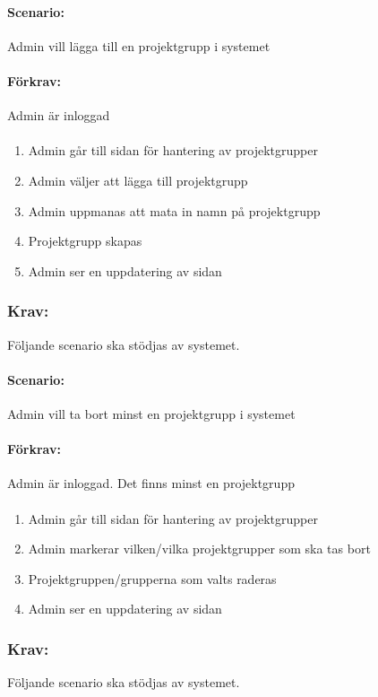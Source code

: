 \documentclass[paper=a4, fontsize=11pt,twoside]{article}
\begin{document}
\paragraph{Scenario:}
Admin vill lägga till en projektgrupp i systemet
\paragraph{Förkrav:}
Admin är inloggad
\paragraph{}
\begin{enumerate}
\item Admin går till sidan för hantering av projektgrupper
\item Admin väljer att lägga till projektgrupp
\item Admin uppmanas att mata in namn på projektgrupp
\item Projektgrupp skapas
\item Admin ser en uppdatering av sidan
\end{enumerate}

\subsubsection*{Krav:} 
Följande scenario ska stödjas av systemet.
\paragraph{Scenario:}
Admin vill ta bort minst en projektgrupp i systemet
\paragraph{Förkrav:}
Admin är inloggad. Det finns minst en projektgrupp
\paragraph{}
\begin{enumerate}
\item Admin går till sidan för hantering av projektgrupper
\item Admin markerar vilken/vilka projektgrupper som ska tas bort
\item Projektgruppen/grupperna som valts raderas
\item Admin ser en uppdatering av sidan
\end{enumerate}

\subsubsection*{Krav:} Följande scenario ska stödjas av systemet. 
\end{document}
